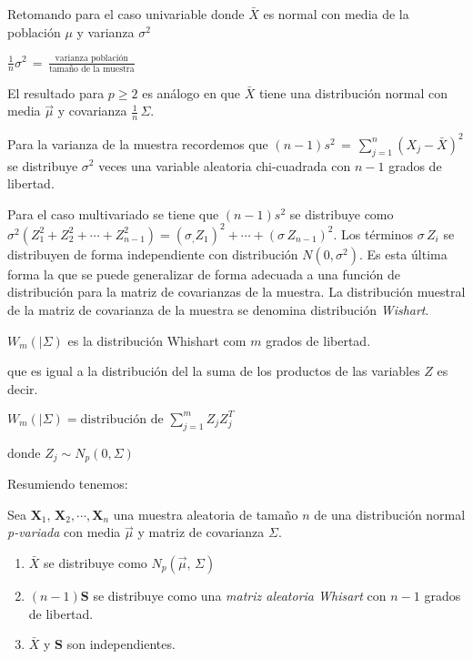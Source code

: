 \documentclass[spanish]{report}
\begin{document}
Retomando para el caso univariable donde $\bar{X}$ es normal con media de la población $\mu$ y varianza $\sigma^2$

\vspace{5pt}
$\frac{1}{n}\sigma^2\,=\,\frac{\text{varianza población}}{\text{tamaño de la muestra}}$  

\vspace{5pt}
El resultado para $p \geq 2$ es análogo en que $\bar{X}$ tiene una distribución normal con media $\vec{\mu}$ y covarianza $\frac{1}{n}\,\Sigma$.

Para la varianza de la muestra recordemos que $(n-1)s^2\,=\,\sum_{j=1}^n(X_j-\bar{X})^2$ se distribuye $\sigma^2$ veces una variable aleatoria chi-cuadrada con $n-1$ grados de libertad.

Para el caso multivariado se tiene que $(n-1)s^2$ se distribuye como $\sigma^2(Z^2_1+Z^2_2+\cdots+Z^2_{n-1})=(\sigma_,Z_1)^2+\cdots+(\sigma\,Z_{n-1})^2$. Los términos $\sigma\,Z_i$ se distribuyen de forma independiente con distribución $N(0,\sigma^2)$. Es esta última forma la que se puede generalizar de forma adecuada a una función de distribución para la matriz de covarianzas de la muestra.
La distribución muestral de la matriz de covarianza de la muestra se denomina distribución \emph{Wishart}. 

\vspace{5pt}
$W_m(|\Sigma)$ es la distribución Whishart com $m$ grados de libertad.

que es igual a la distribución del la suma de los productos de las variables $Z$ es decir.

\vspace{5pt}
$W_m(|\Sigma)= \text{distribución de   } \sum_{j=1}^m Z_jZ_j^T$

donde $Z_j \sim N_p(0,\Sigma)$ 

Resumiendo tenemos:

Sea $\textbf{X}_1,\,\textbf{X}_2,\cdots,\textbf{X}_n$ una muestra aleatoria de tamaño $n$ de una distribución normal \emph{p-variada} con media $\vec{\mu}$ y matriz de covarianza $\Sigma$.

\begin{enumerate}
\item $\bar{X}$ se distribuye como $N_p(\vec{\mu},\,\Sigma)$
\item $(n-1)\textbf{S}$ se distribuye como una \emph{matriz aleatoria Whisart} con $n-1$ grados de libertad.
\item $\bar{X}$ y $\textbf{S}$ son independientes.
\end{enumerate}
\end{document}
